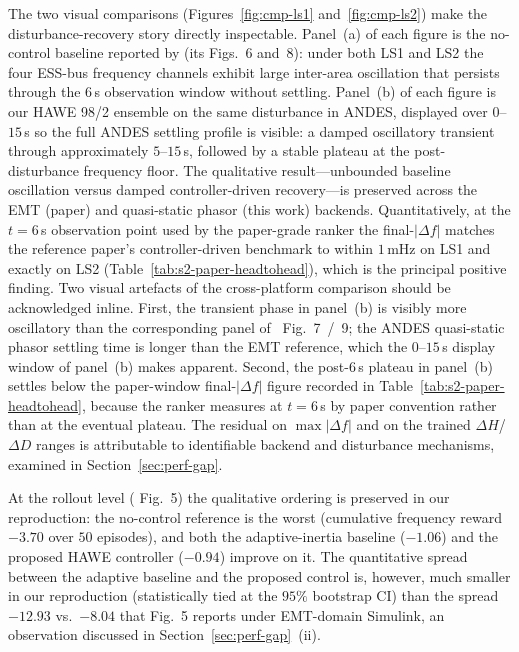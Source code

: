 \documentclass{unnc-fyp}
\begin{document}
The two visual comparisons (Figures~\ref{fig:cmp-ls1}
and~\ref{fig:cmp-ls2}) make the disturbance-recovery story directly
inspectable. Panel~(a) of each figure is the no-control baseline
reported by \cite{yang2023ddic} (its Figs.~6 and~8): under both LS1
and LS2 the four ESS-bus frequency channels exhibit large inter-area
oscillation that persists through the $6$\,s observation window
without settling. Panel~(b) of each figure is our HAWE 98/2 ensemble
on the same disturbance in ANDES, displayed over $0$--$15$\,s so the
full ANDES settling profile is visible: a damped oscillatory
transient through approximately $5$--$15$\,s, followed by a stable
plateau at the post-disturbance frequency floor. The qualitative
result---unbounded baseline oscillation versus damped
controller-driven recovery---is preserved across the EMT (paper) and
quasi-static phasor (this work) backends. Quantitatively, at the
$t=6$\,s observation point used by the paper-grade ranker the
final-$|\Delta f|$ matches the reference paper's controller-driven
benchmark to within $1$\,mHz on LS1 and exactly on LS2
(Table~\ref{tab:s2-paper-headtohead}), which is the principal
positive finding. Two visual artefacts of the cross-platform
comparison should be acknowledged inline. First, the transient phase
in panel~(b) is visibly more oscillatory than the corresponding
panel of \cite{yang2023ddic}~Fig.~7~/~9; the ANDES quasi-static
phasor settling time is longer than the EMT reference, which the
$0$--$15$\,s display window of panel~(b) makes apparent. Second, the
post-$6$\,s plateau in panel~(b) settles below the paper-window
final-$|\Delta f|$ figure recorded in
Table~\ref{tab:s2-paper-headtohead}, because the ranker measures at
$t=6$\,s by paper convention rather than at the eventual plateau.
The residual on $\max|\Delta f|$ and on the trained
$\Delta H$/$\Delta D$ ranges is attributable to identifiable backend
and disturbance mechanisms, examined in
Section~\ref{sec:perf-gap}.

At the rollout level (\cite{yang2023ddic} Fig.~5) the qualitative
ordering is preserved in our reproduction: the no-control
reference is the worst (cumulative frequency reward $-3.70$ over
$50$ episodes), and both the adaptive-inertia baseline ($-1.06$)
and the proposed HAWE controller ($-0.94$) improve on it. The
quantitative spread between the adaptive baseline and the proposed
control is, however, much smaller in our reproduction
(statistically tied at the $95\%$ bootstrap CI) than the spread
$-12.93$ vs.\ $-8.04$ that \cite{yang2023ddic} Fig.~5 reports
under EMT-domain Simulink, an observation discussed in
Section~\ref{sec:perf-gap}~(ii).
\end{document}
